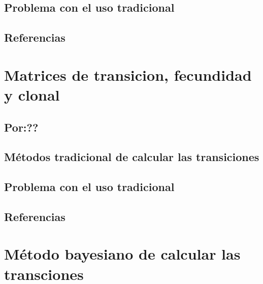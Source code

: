 \documentclass[
]{book}
\theoremstyle{definition}
\theoremstyle{definition}
\theoremstyle{definition}
\theoremstyle{definition}
\theoremstyle{remark}
\begin{document}
\hypertarget{problema-con-el-uso-tradicional-1}{%
\section{Problema con el uso tradicional}\label{problema-con-el-uso-tradicional-1}}

\hypertarget{referencias-4}{%
\section{Referencias}\label{referencias-4}}

\hypertarget{matrices-de-transicion-fecundidad-y-clonal}{%
\chapter{Matrices de transicion, fecundidad y clonal}\label{matrices-de-transicion-fecundidad-y-clonal}}

\hypertarget{por}{%
\section{Por:??}\label{por}}

\hypertarget{muxe9todos-tradicional-de-calcular-las-transiciones-2}{%
\section{Métodos tradicional de calcular las transiciones}\label{muxe9todos-tradicional-de-calcular-las-transiciones-2}}

\hypertarget{problema-con-el-uso-tradicional-2}{%
\section{Problema con el uso tradicional}\label{problema-con-el-uso-tradicional-2}}

\hypertarget{referencias-5}{%
\section{Referencias}\label{referencias-5}}

\hypertarget{muxe9todo-bayesiano-de-calcular-las-transciones}{%
\chapter{Método bayesiano de calcular las transciones}\label{muxe9todo-bayesiano-de-calcular-las-transciones}}
\end{document}
